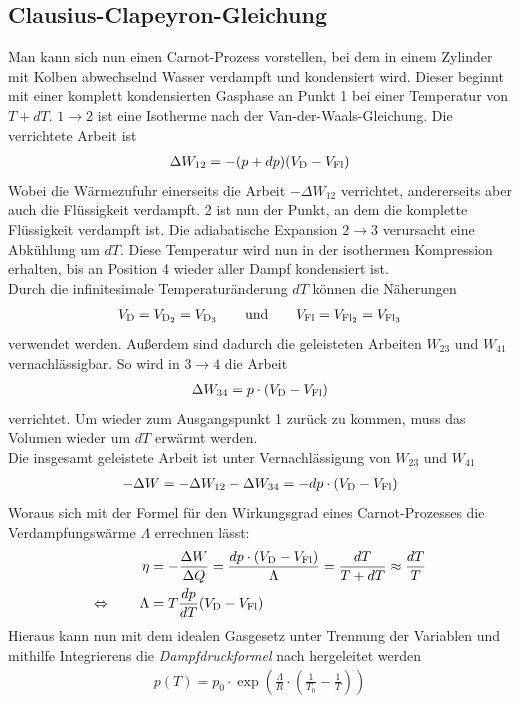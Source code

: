\documentclass[12pt,a4paper,titlepage,headinclude,bibtotoc]{scrartcl}
\begin{document}
\subsection{Clausius-Clapeyron-Gleichung}
Man kann sich nun einen Carnot-Prozess vorstellen, bei dem in einem Zylinder mit Kolben abwechselnd Wasser verdampft und kondensiert wird.
Dieser beginnt mit einer komplett kondensierten Gasphase an Punkt 1 bei einer Temperatur von $T+dT$.
$1\rightarrow 2$ ist eine Isotherme nach der Van-der-Waals-Gleichung.
Die verrichtete Arbeit ist%
\begin{align*}
	\Delta W_{12}=-(p+dp)(V_\text D-V_\text{Fl})
\end{align*}
Wobei die Wärmezufuhr einerseits die Arbeit $-\Delta W_{12}$ verrichtet, andererseits aber auch die Flüssigkeit verdampft.
2 ist nun der Punkt, an dem die komplette Flüssigkeit verdampft ist.
Die adiabatische Expansion $2\rightarrow 3$ verursacht eine Abkühlung um $dT$.
Diese Temperatur wird nun in der isothermen Kompression erhalten, bis an Position 4 wieder aller Dampf kondensiert ist.\\
Durch die infinitesimale Temperaturänderung $dT$ können die Näherungen
\begin{align*}
	V_\text D = V_{\text{D}_2}= V_{\text{D}_3}\qquad\text{und}\qquad V_\text{Fl}=V_{\text{Fl}_2}=V_{\text{Fl}_3}
\end{align*}
verwendet werden.
Außerdem sind dadurch die geleisteten Arbeiten $W_{23}$ und $W_{41}$ vernachlässigbar.
So wird in $3\rightarrow 4$ die Arbeit
\begin{align*}
	\Delta W_{34}=p\cdot (V_\text D-V_\text{Fl})
\end{align*}
verrichtet.
Um wieder zum Ausgangspunkt 1 zurück zu kommen, muss das Volumen wieder um $dT$ erwärmt werden.\\
Die insgesamt geleistete Arbeit ist unter Vernachlässigung von $W_{23}$ und $W_{41}$
\begin{align*}
	-\Delta W=-\Delta W_{12}-\Delta W_{34}=-dp\cdot (V_\text D -V_\text{Fl})
\end{align*}
Woraus sich mit der Formel für den Wirkungsgrad eines Carnot-Prozesses die Verdampfungswärme $\Lambda$ errechnen lässt:
\begin{align*}
	\eta&=-\frac{\Delta W}{\Delta Q}=\frac{dp\cdot (V_\text D-V_\text{Fl})}{\Lambda}=\frac{dT}{T+dT}\approx \frac{dT}{T}\\
	\Leftrightarrow\qquad \Lambda&=T\frac{dp}{dT}(V_\text D-V_\text{Fl})
\end{align*}
Hieraus kann nun mit dem idealen Gasgesetz unter Trennung der Variablen und mithilfe Integrierens die \emph{Dampfdruckformel} nach \cite[S. 342, Formel (10.127)]{demtroeder} hergeleitet werden
\begin{align}
	p(T)=p_0\cdot \exp\left( \frac{\Lambda}{R}\cdot\left( \frac{1}{T_0}-\frac{1}{T} \right)\right)
\end{align}
\end{document}
